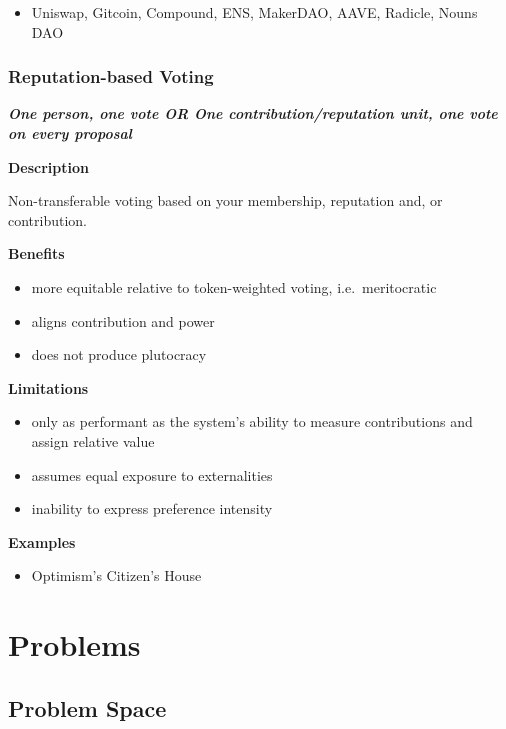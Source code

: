 \documentclass[
]{article}
\providecommand{\tightlist}{%
  \setlength{\itemsep}{0pt}\setlength{\parskip}{0pt}}
\begin{document}
\begin{itemize}
\tightlist
\item
  Uniswap, Gitcoin, Compound, ENS, MakerDAO, AAVE, Radicle, Nouns DAO
\end{itemize}

\hypertarget{reputation-based-voting}{%
\subsubsection{Reputation-based Voting}\label{reputation-based-voting}}

\textbf{\emph{One person, one vote OR One contribution/reputation unit,
one vote on every proposal}}

\textbf{Description}

Non-transferable voting based on your membership, reputation and, or
contribution.

\textbf{Benefits}

\begin{itemize}
\tightlist
\item
  more equitable relative to token-weighted voting, i.e.~meritocratic
\item
  aligns contribution and power
\item
  does not produce plutocracy
\end{itemize}

\textbf{Limitations}

\begin{itemize}
\tightlist
\item
  only as performant as the system's ability to measure contributions
  and assign relative value
\item
  assumes equal exposure to externalities
\item
  inability to express preference intensity
\end{itemize}

\textbf{Examples}

\begin{itemize}
\tightlist
\item
  Optimism's Citizen's House
\end{itemize}
\hypertarget{problems}{%
\section{Problems}\label{problems}}

\hypertarget{problem-space}{%
\subsection{Problem Space}\label{problem-space}}
\end{document}
